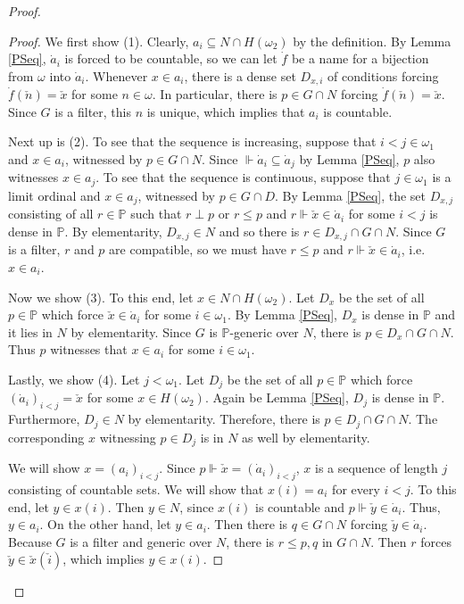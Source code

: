 \documentclass[10pt,a4paper]{amsart}
\newcommand{\dP}{\mathbb{P}}
\begin{document}
\begin{proof}
		\begin{proof}
			We first show (1). Clearly, $a_i\subseteq N\cap H(\omega_2)$ by the definition. By Lemma \ref{PSeq}, $\dot{a}_i$ is forced to be countable, so we can let $\dot{f}$ be a name for a bijection from $\omega$ into $\dot{a}_i$. Whenever $x\in a_i$, there is a dense set $D_{x,i}$ of conditions forcing $\dot{f}(\check{n})=\check{x}$ for some $n\in\omega$. In particular, there is $p\in G\cap N$ forcing $\dot{f}(\check{n})=\check{x}$. Since $G$ is a filter, this $n$ is unique, which implies that $a_i$ is countable.
			
			Next up is (2). To see that the sequence is increasing, suppose that $i<j\in\omega_1$ and $x\in a_i$, witnessed by $p\in G\cap N$. Since $\Vdash\dot{a}_i\subseteq\dot{a}_j$ by Lemma \ref{PSeq}, $p$ also witnesses $x\in a_j$. To see that the sequence is continuous, suppose that $j\in\omega_1$ is a limit ordinal and $x\in a_j$, witnessed by $p\in G\cap D$. By Lemma \ref{PSeq}, the set $D_{x,j}$ consisting of all $r\in\dP$ such that $r\perp p$ or $r\leq p$ and $r\Vdash\check{x}\in\dot{a}_i$ for some $i<j$ is dense in $\dP$. By elementarity, $D_{x,j}\in N$ and so there is $r\in D_{x,j}\cap G\cap N$. Since $G$ is a filter, $r$ and $p$ are compatible, so we must have $r\leq p$ and $r\Vdash\check{x}\in\dot{a}_i$, i.e. $x\in a_i$.
			
			Now we show (3). To this end, let $x\in N\cap H(\omega_2)$. Let $D_x$ be the set of all $p\in\dP$ which force $\check{x}\in\dot{a}_i$ for some $i\in\omega_1$. By Lemma \ref{PSeq}, $D_x$ is dense in $\dP$ and it lies in $N$ by elementarity. Since $G$ is $\dP$-generic over $N$, there is $p\in D_x\cap G\cap N$. Thus $p$ witnesses that $x\in a_i$ for some $i\in\omega_1$.
			
			Lastly, we show (4). Let $j<\omega_1$. Let $D_j$ be the set of all $p\in\dP$ which force $(\dot{a}_i)_{i<j}=\check{x}$ for some $x\in H(\omega_2)$. Again be Lemma \ref{PSeq}, $D_j$ is dense in $\dP$. Furthermore, $D_j\in N$ by elementarity. Therefore, there is $p\in D_j\cap G\cap N$. The corresponding $x$ witnessing $p\in D_j$ is in $N$ as well by elementarity.
			
			We will show $x=(a_i)_{i<j}$. Since $p\Vdash\check{x}=(\dot{a}_i)_{i<j}$, $x$ is a sequence of length $j$ consisting of countable sets. We will show that $x(i)=a_i$ for every $i<j$. To this end, let $y\in x(i)$. Then $y\in N$, since $x(i)$ is countable and $p\Vdash\check{y}\in\dot{a}_i$. Thus, $y\in a_i$. On the other hand, let $y\in a_i$. Then there is $q\in G\cap N$ forcing $\check{y}\in\dot{a}_i$. Because $G$ is a filter and generic over $N$, there is $r\leq p,q$ in $G\cap N$. Then $r$ forces $\check{y}\in\check{x}(\check{i})$, which implies $y\in x(i)$.
		\end{proof}
		

\end{proof}
\end{document}
